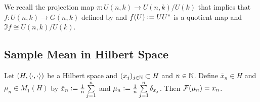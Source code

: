 \documentclass{book}
\begin{document}
	\begin{note}
		We recall the projection map $\pi: U(n,k) \rightarrow U(n,k) / U(k)$ that  implies that $f: U(n,k) \rightarrow G(n,k)$ defined by and $f(U) \vcentcolon= UU^*$ is a quotient map and $\Im f \cong U(n,k) / U(k)$.  
	\end{note}
	
	
	
	
	
	
	
	
	
	
	
	
	
	
	
	
	
	
	
	
	
	
	
	
	
	
	
	
	
	
	
	\subsection{Sample Mean in Hilbert Space}
	
	\begin{ex}
		Let $(H, \langle \cdot, \cdot \rangle)$ be a Hilbert space and $(x_j)_{j \in \mathbb{N}} \subset H$ and $n \in \mathbb{N}$. Define $\bar{x}_n \in H$ and $\mu_n \in M_1(H)$ by $\bar{x}_n \vcentcolon=  \frac{1}{n} \sum\limits_{j=1}^n$ and $\mu_{n} \vcentcolon= \frac{1}{n} \sum\limits_{j=1}^n \delta_{x_j}$. Then $\mathcal{F}(\mu_n) = \bar{x}_n$.
	\end{ex}
	
\end{document}
